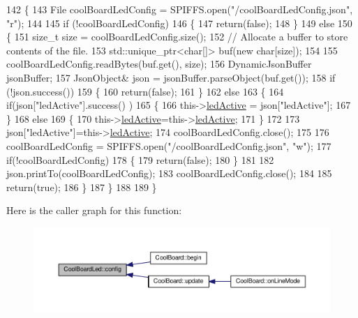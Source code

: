 \begin{DoxyCode}
142 \{
143     File coolBoardLedConfig = SPIFFS.open(\textcolor{stringliteral}{"/coolBoardLedConfig.json"}, \textcolor{stringliteral}{"r"});
144 
145     \textcolor{keywordflow}{if} (!coolBoardLedConfig) 
146     \{
147         \textcolor{keywordflow}{return}(\textcolor{keyword}{false});
148     \}
149     \textcolor{keywordflow}{else}
150     \{
151         \textcolor{keywordtype}{size\_t} size = coolBoardLedConfig.size();
152         \textcolor{comment}{// Allocate a buffer to store contents of the file.}
153         std::unique\_ptr<char[]> buf(\textcolor{keyword}{new} \textcolor{keywordtype}{char}[size]);
154 
155         coolBoardLedConfig.readBytes(buf.get(), size);
156         DynamicJsonBuffer jsonBuffer;
157         JsonObject& json = jsonBuffer.parseObject(buf.get());
158         \textcolor{keywordflow}{if} (!json.success()) 
159         \{
160               \textcolor{keywordflow}{return}(\textcolor{keyword}{false});
161         \} 
162         \textcolor{keywordflow}{else}
163         \{     
164             \textcolor{keywordflow}{if}(json[\textcolor{stringliteral}{"ledActive"}].success() )
165             \{
166                 this->\hyperlink{classCoolBoardLed_a5f17c135516fcf4b44ea8a096ba0177a}{ledActive} = json[\textcolor{stringliteral}{"ledActive"}]; 
167             \}
168             \textcolor{keywordflow}{else}
169             \{
170                 this->\hyperlink{classCoolBoardLed_a5f17c135516fcf4b44ea8a096ba0177a}{ledActive}=this->\hyperlink{classCoolBoardLed_a5f17c135516fcf4b44ea8a096ba0177a}{ledActive};          
171             \}
172             
173             json[\textcolor{stringliteral}{"ledActive"}]=this->\hyperlink{classCoolBoardLed_a5f17c135516fcf4b44ea8a096ba0177a}{ledActive};
174             coolBoardLedConfig.close();
175             
176             coolBoardLedConfig = SPIFFS.open(\textcolor{stringliteral}{"/coolBoardLedConfig.json"}, \textcolor{stringliteral}{"w"});
177             \textcolor{keywordflow}{if}(!coolBoardLedConfig)
178             \{
179                 \textcolor{keywordflow}{return}(\textcolor{keyword}{false});          
180             \}
181 
182             json.printTo(coolBoardLedConfig);
183             coolBoardLedConfig.close();
184 
185               \textcolor{keywordflow}{return}(\textcolor{keyword}{true}); 
186         \}
187     \}   
188 
189 \}               
\end{DoxyCode}
Here is the caller graph for this function\+:\nopagebreak
\begin{figure}[H]
\begin{center}
\leavevmode
\includegraphics[width=350pt]{classCoolBoardLed_a1b60e5e30bea96c49ed62ed1bf1ffc8b_icgraph}
\end{center}
\end{figure}
